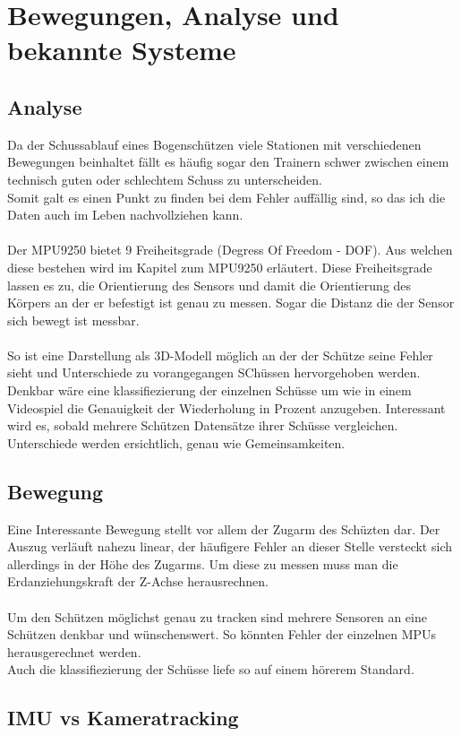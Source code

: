 \chapter{Bewegungen, Analyse und bekannte Systeme}
\section{Analyse}
Da der Schussablauf eines Bogenschützen viele Stationen mit verschiedenen Bewegungen 
beinhaltet fällt es häufig sogar den Trainern schwer zwischen einem technisch guten
oder schlechtem Schuss zu unterscheiden.\\ 
Somit galt es einen Punkt zu finden bei dem Fehler auffällig sind, so das ich die Daten auch im 
Leben nachvollziehen kann.\\
\\
Der MPU9250 bietet 9 Freiheitsgrade (Degress Of Freedom - DOF). Aus welchen diese bestehen wird
im Kapitel zum MPU9250 erläutert. Diese Freiheitsgrade lassen es zu, die Orientierung des Sensors 
und damit die Orientierung des Körpers an der er befestigt ist genau zu messen. Sogar die Distanz 
die der Sensor sich bewegt ist messbar.\\
\\
So ist eine Darstellung als 3D-Modell möglich an der der Schütze seine Fehler sieht und Unterschiede
zu vorangegangen SChüssen hervorgehoben werden. \\
Denkbar wäre eine klassifiezierung der einzelnen Schüsse um wie in einem Videospiel die Genauigkeit
der Wiederholung in Prozent anzugeben. Interessant wird es, sobald mehrere Schützen Datensätze
ihrer Schüsse vergleichen. Unterschiede werden ersichtlich, genau wie Gemeinsamkeiten.
\\
\section {Bewegung}
Eine Interessante Bewegung stellt vor allem der Zugarm des 
Schüzten dar. Der Auszug verläuft nahezu linear, der häufigere Fehler 
an dieser Stelle versteckt sich allerdings in der Höhe des Zugarms. 
Um diese zu messen muss man die Erdanziehungskraft der Z-Achse herausrechnen.\\
\\
Um den Schützen möglichst genau zu tracken sind mehrere Sensoren an eine Schützen denkbar und
wünschenswert. So könnten Fehler der einzelnen MPUs herausgerechnet werden.\\
Auch die klassifiezierung der Schüsse liefe so auf einem hörerem Standard.
\\

\section{IMU vs Kameratracking}



